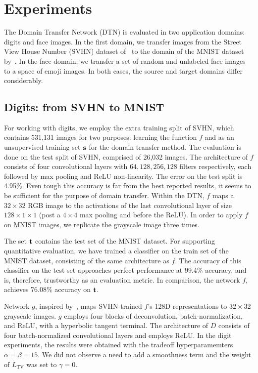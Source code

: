 \documentclass{article} %
\begin{document}
\section{Experiments}
\label{sec:expa}

The Domain Transfer Network (DTN) is evaluated in two application domains: digits and face images. In the first domain, we transfer images from the Street View House Number (SVHN) dataset of~\cite{svhn} to the domain of the MNIST dataset by~\cite{mnist}. In the face domain, we transfer a set of random and unlabeled face images to a space of emoji images. In both cases, the source and target domains differ considerably.

\subsection{Digits: from SVHN to MNIST}

For working with digits, we employ the extra training split of SVHN, which contains 531,131 images for two purposes: learning the function $f$ and as an unsupervised training set $\textbf s$ for the domain transfer method. The evaluation is done on the test split of SVHN, comprised of 26,032 images. The architecture of $f$ consists of four convolutional layers with ${64, 128, 256,128}$ filters respectively, each followed by max pooling and ReLU non-linearity. The error on the test split is 4.95\%. Even tough this accuracy is far from the best reported results, it seems to be sufficient for the purpose of domain transfer. Within the DTN, $f$ maps a $32 \times 32$ RGB image to the activations of the last convolutional layer of size $128 \times 1 \times 1$ (post a $4 \times 4$ max pooling and before the ReLU). In order to apply $f$ on MNIST images, we replicate the grayscale image three times.

The set $\textbf t$ contains the test set of the MNIST dataset. For supporting quantitative evaluation, we have trained a classifier on the train set of the MNIST dataset, consisting of the same architecture as $f$. The accuracy of this classifier on the test set approaches perfect performance at 99.4\% accuracy, and is, therefore, trustworthy as an evaluation metric. In comparison, the network $f$, achieves 76.08\% accuracy on $\textbf t$. 

Network $g$, inspired by~\cite{dcgan}, maps SVHN-trained $f$'s 128D representations to $32 \times 32$ grayscale images. $g$ employs four blocks of deconvolution, batch-normalization, and ReLU, with a hyperbolic tangent terminal. The architecture of $D$ consists of four batch-normalized convolutional layers and employs ReLU. In the digit experiments, the results were obtained with the tradeoff hyperparamemters $\alpha=\beta=15$. We did not observe a need to add a smoothness term and the weight of $L_\text{TV}$ was set to $\gamma=0$. 
\end{document}
